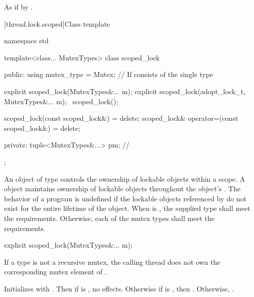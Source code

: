 \begin{itemdescr}
\pnum
\effects
As if by .
\end{itemdescr}


[thread.lock.scoped]{Class template }

%
\begin{codeblock}
namespace std {
  template<class... MutexTypes>
  class scoped_lock {
  public:
    using mutex_type = Mutex;   // If  consists of the single type 

    explicit scoped_lock(MutexTypes&... m);
    explicit scoped_lock(adopt_lock_t, MutexTypes&... m);
    ~scoped_lock();

    scoped_lock(const scoped_lock&) = delete;
    scoped_lock& operator=(const scoped_lock&) = delete;

  private:
    tuple<MutexTypes&...> pm;   // \expos
  };
}
\end{codeblock}

\pnum
An object of type  controls the ownership of lockable objects
within a scope. A  object maintains ownership of lockable
objects throughout the  object's .
The behavior of a program is undefined if the lockable objects referenced by
 do not exist for the entire lifetime of the 
object.
When  is ,
the supplied  type
shall meet the  requirements.
Otherwise, each of the mutex types
shall meet the  requirements.

%
\begin{itemdecl}
explicit scoped_lock(MutexTypes&... m);
\end{itemdecl}

\begin{itemdescr}
\pnum
\expects
If a  type is not a recursive mutex,
the calling thread does not own the corresponding mutex element of .

\pnum
\effects
Initializes  with .
Then if  is , no effects.
Otherwise if  is , then .
Otherwise, .
\end{itemdescr}

